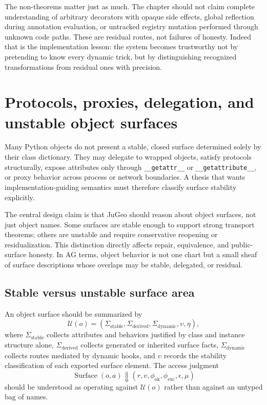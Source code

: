 \documentclass[11pt]{report}
\begin{document}
The non-theorems matter just as much. The chapter should not claim complete understanding of arbitrary decorators with opaque side effects, global reflection during annotation evaluation, or untracked registry mutation performed through unknown code paths. These are residual routes, not failures of honesty. Indeed that is the implementation lesson: the system becomes trustworthy not by pretending to know every dynamic trick, but by distinguishing recognized transformations from residual ones with precision.
\chapter{Protocols, proxies, delegation, and unstable object surfaces}
Many Python objects do not present a stable, closed surface determined solely by their class dictionary. They may delegate to wrapped objects, satisfy protocols structurally, expose attributes only through \texttt{\_\_getattr\_\_} or \texttt{\_\_getattribute\_\_}, or proxy behavior across process or network boundaries. A thesis that wants implementation-guiding semantics must therefore classify surface stability explicitly.

The central design claim is that JuGeo should reason about object surfaces, not just object names. Some surfaces are stable enough to support strong transport theorems; others are unstable and require conservative reopening or residualization. This distinction directly affects repair, equivalence, and public-surface honesty. In AG terms, object behavior is not one chart but a small sheaf of surface descriptions whose overlaps may be stable, delegated, or residual.
\section{Stable versus unstable surface area}
An object surface should be summarized by
\[
\mathcal{U}(o) = (\Sigma_{\mathrm{stable}},\Sigma_{\mathrm{derived}},\Sigma_{\mathrm{dynamic}},\upsilon,\eta),
\]
where $\Sigma_{\mathrm{stable}}$ collects attributes and behaviors justified by class and instance structure alone, $\Sigma_{\mathrm{derived}}$ collects generated or inherited surface facts, $\Sigma_{\mathrm{dynamic}}$ collects routes mediated by dynamic hooks, and $\upsilon$ records the stability classification of each exported surface element. The access judgment
\[
\operatorname{Surface}(o,a) \Downarrow (r,v,\phi_{\mathrm{ok}},\phi_{\mathrm{exc}},\epsilon,\mu)
\]
should be understood as operating against $\mathcal{U}(o)$ rather than against an untyped bag of names.
\end{document}
